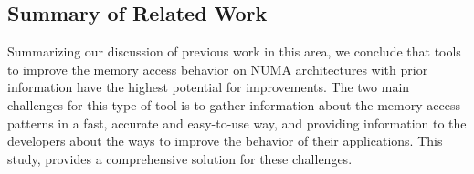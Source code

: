 \subsection{Summary of Related Work}

Summarizing our discussion of previous work in this area, we conclude that tools to improve the memory access behavior on NUMA architectures with prior information have the highest potential for improvements.
The two main challenges for this type of tool is to gather information about the memory access patterns in a fast, accurate and easy-to-use way, and providing information to the developers about the ways to improve the behavior of their applications.
This study, provides a comprehensive solution for these challenges.



